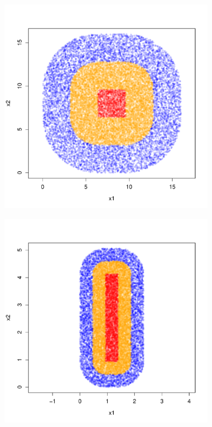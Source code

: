 \documentclass{article}
\newcommand{\1}{\mathbf{1}}
\theoremstyle{aldenthm}
\theoremstyle{aldenrmrk}
\begin{document}
\begin{figure}
	\centering
	\begin{adjustbox}{minipage=\linewidth,scale=0.8}
	\begin{subfigure}{.33\linewidth}
		\includegraphics[width=\linewidth]{example1plots/sample2}
		\caption{}
	\end{subfigure}
	\begin{subfigure}{.33\linewidth}
		\includegraphics[width=\linewidth]{example1plots/sample1}

\end{subfigure}
\end{adjustbox}
\end{figure}
\end{document}
